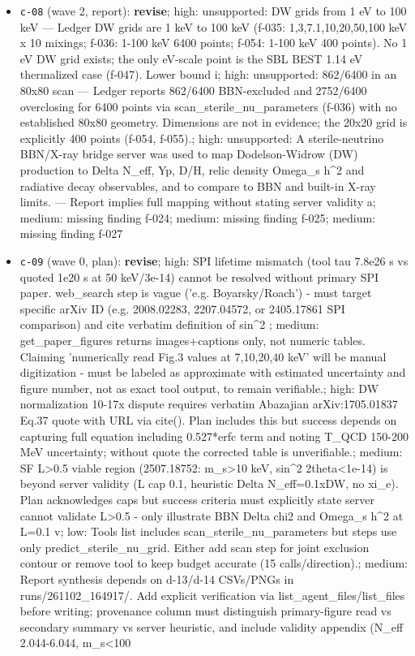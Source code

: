 \documentclass[11pt,a4paper]{article}
\begin{document}
\begin{itemize}
  \item \texttt{c-08} (wave 2, report): \textbf{revise}; high: unsupported: DW grids from 1 eV to 100 keV --- Ledger DW grids are 1 keV to 100 keV (f-035: 1,3,7.1,10,20,50,100 keV x 10 mixings; f-036: 1-100 keV 6400 points; f-054: 1-100 keV 400 points). No 1 eV DW grid exists; the only eV-scale point is the SBL BEST 1.14 eV thermalized case (f-047). Lower bound i; high: unsupported: 862/6400 in an 80x80 scan --- Ledger reports 862/6400 BBN-excluded and 2752/6400 overclosing for 6400 points via scan\_sterile\_nu\_parameters (f-036) with no established 80x80 geometry. Dimensions are not in evidence; the 20x20 grid is explicitly 400 points (f-054, f-055).; high: unsupported: A sterile-neutrino BBN/X-ray bridge server was used to map Dodelson-Widrow (DW) production to Delta N\_eff, Yp, D/H, relic density Omega\_s h\textasciicircum{}2 and radiative decay observables, and to compare to BBN and built-in X-ray limits. --- Report implies full mapping without stating server validity a; medium: missing finding f-024; medium: missing finding f-025; medium: missing finding f-027
  \item \texttt{c-09} (wave 0, plan): \textbf{revise}; high: SPI lifetime mismatch (tool tau 7.8e26 s vs quoted 1e20 s at 50 keV/3e-14) cannot be resolved without primary SPI paper. web\_search step is vague ('e.g. Boyarsky/Roach') - must target specific arXiv ID (e.g. 2008.02283, 2207.04572, or 2405.17861 SPI comparison) and cite verbatim definition of sin\textasciicircum{}2 ; medium: get\_paper\_figures returns images+captions only, not numeric tables. Claiming 'numerically read Fig.3 values at 7,10,20,40 keV' will be manual digitization - must be labeled as approximate with estimated uncertainty and figure number, not as exact tool output, to remain verifiable.; high: DW normalization 10-17x dispute requires verbatim Abazajian arXiv:1705.01837 Eq.37 quote with URL via cite(). Plan includes this but success depends on capturing full equation including 0.527*erfc term and noting T\_QCD 150-200 MeV uncertainty; without quote the corrected table is unverifiable.; medium: SF L\textgreater{}0.5 viable region (2507.18752: m\_s\textgreater{}10 keV, sin\textasciicircum{}2 2theta\textless{}1e-14) is beyond server validity (L cap 0.1, heuristic Delta N\_eff=0.1xDW, no xi\_e). Plan acknowledges caps but success criteria must explicitly state server cannot validate L\textgreater{}0.5 - only illustrate BBN Delta chi2 and Omega\_s h\textasciicircum{}2 at L=0.1 v; low: Tools list includes scan\_sterile\_nu\_parameters but steps use only predict\_sterile\_nu\_grid. Either add scan step for joint exclusion contour or remove tool to keep budget accurate (15 calls/direction).; medium: Report synthesis depends on d-13/d-14 CSVs/PNGs in runs/261102\_164917/. Add explicit verification via list\_agent\_files/list\_files before writing; provenance column must distinguish primary-figure read vs secondary summary vs server heuristic, and include validity appendix (N\_eff 2.044-6.044, m\_s\textless{}100

\end{itemize}
\end{document}
